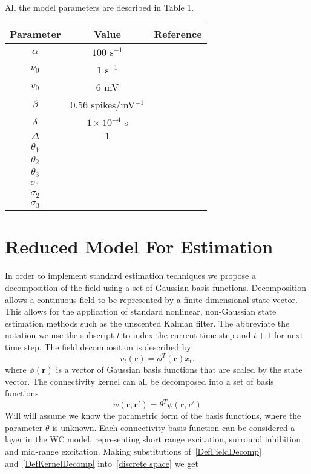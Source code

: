 \documentclass[onecolumn,draftcls]{IEEEtran}
\begin{document}
All the model parameters are described in Table 1.


\begin{tabular}{ccc}
\hline
Parameter & Value & Reference\\
\hline
$\alpha$ & $100$ s$^{-1}$ &\\
\hline
$\nu_0$ & $1$ s$^{-1}$ &\\
\hline
$v_0$ & $6$ mV &\\
\hline
$\beta$ & $0.56$ spikes/mV$^{-1}$ & \\
\hline
$\delta$ & $1\times10^{-4}$ s &\\
\hline
$\Delta$ & $1$ &\\
\hline
$\theta_1$ &  &\\
\hline
$\theta_2$ &  &\\
\hline
$\theta_3$ &  &\\
\hline
$\sigma_1$ &  &\\
\hline
$\sigma_2$ &  &\\
\hline
$\sigma_3$ &  &\\
\hline
\end{tabular}


\section{Reduced Model For Estimation}

In order to implement standard estimation techniques we propose a decomposition of the field using a set of Gaussian basis functions. Decomposition allows a continuous field to be represented by a finite dimensional state vector. This allows for the application of standard nonlinear, non-Gaussian state estimation methods such as the unscented Kalman filter. The abbreviate the notation we use the subscript $t$ to index the current time step and $t+1$ for next time step. The field decomposition is described by
\begin{equation}\label{DefFieldDecomp}
v_t\left( \mathbf{r} \right) = \phi ^T\left( \mathbf{r} \right) x_t.
\end{equation}
where $\phi(\mathbf{r})$ is a vector of Gaussian basis functions that are scaled by the state vector. The connectivity kernel can all be decomposed into a set of basis functions
\begin{equation}\label{DefKernelDecomp}
\tilde{w}( \mathbf{r} , \mathbf{r'} ) = \theta^T\psi(\mathbf{r} , \mathbf{r'} )
\end{equation}
Will will assume we know the parametric form of the basis functions, where the parameter $\theta$ is unknown. Each connectivity basis function can be considered a layer in the WC model, representing short range excitation, surround inhibition and mid-range excitation. Making substitutions of~\ref{DefFieldDecomp} and~\ref{DefKernelDecomp} into~\ref{discrete space} we get
\end{document}

